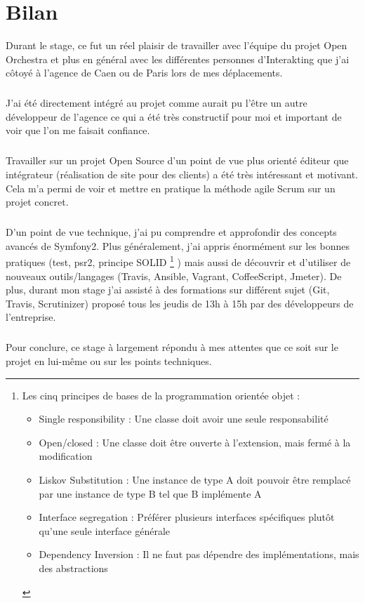 \chapter*{Bilan}
Durant le stage, ce fut un réel plaisir de travailler avec l'équipe du projet Open Orchestra et plus en général avec les différentes personnes d'Interakting que j'ai côtoyé à l'agence de Caen ou de Paris lors de mes déplacements.
\paragraph{}
J'ai été directement intégré au projet comme aurait pu l'être un autre développeur de l'agence ce qui a été très constructif pour moi et important de voir que l'on me faisait confiance.
\paragraph{}
Travailler sur un projet Open Source d'un point de vue plus orienté éditeur que intégrateur (réalisation de site pour des clients) a été très intéressant et motivant.  Cela m'a permi de voir et mettre en pratique la méthode agile Scrum sur un projet concret.
\paragraph{}
D'un point de vue technique, j'ai pu comprendre et approfondir des concepts avancés de Symfony2. Plus généralement, j'ai appris énormément sur les bonnes pratiques (test, psr2, principe SOLID \footnote{Les cinq principes de bases de la programmation orientée objet :
\begin{itemize}
\item Single responsibility : Une classe doit avoir une seule responsabilité
\item Open/closed : Une classe doit être ouverte à l'extension, mais fermé à la modification
\item Liskov Substitution : Une instance de type A doit pouvoir être remplacé par une instance de type B tel que B implémente A
\item Interface segregation : Préférer plusieurs interfaces spécifiques plutôt qu'une seule interface générale
\item Dependency Inversion : Il ne faut pas dépendre des implémentations, mais des abstractions
\end{itemize}
}
) mais aussi de découvrir et d'utiliser de nouveaux outils/langages (Travis, Ansible, Vagrant, CoffeeScript, Jmeter). 
De plus, durant mon stage j'ai assisté à des formations sur différent sujet (Git, Travis, Scrutinizer) proposé tous les jeudis de 13h à 15h par des développeurs de l'entreprise.
\paragraph{}
Pour conclure, ce stage à largement répondu à mes attentes que ce soit sur le projet en lui-même ou sur les points techniques.